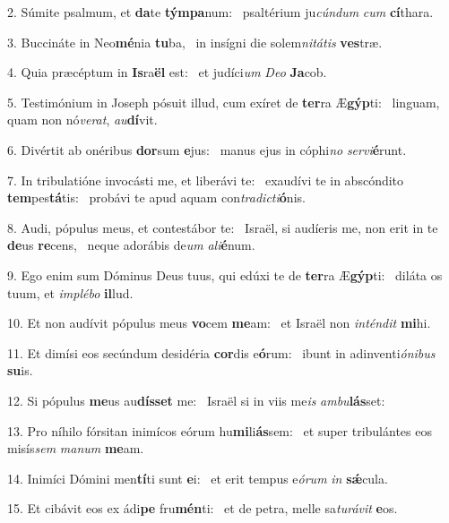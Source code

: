 2. Súmite psalmum, et \textbf{da}te \textbf{tým}\textbf{pa}num: \ast\  psaltérium ju\textit{cún}\textit{dum} \textit{cum} \textbf{cí}thara.\

3. Buccináte in Neo\textbf{mé}nia \textbf{tu}ba, \ast\  in insígni die solem\textit{ni}\textit{tá}\textit{tis} \textbf{ves}træ.\

4. Quia præcéptum in \textbf{Is}ra\textbf{ël} est: \ast\  et judíci\textit{um} \textit{De}\textit{o} \textbf{Ja}cob.\

5. Testimónium in Joseph pósuit illud, cum exíret de \textbf{ter}ra Æ\textbf{gýp}ti: \ast\  linguam, quam non nó\textit{ve}\textit{rat}, \textit{au}\textbf{dí}vit.\

6. Divértit ab onéribus \textbf{dor}sum \textbf{e}jus: \ast\  manus ejus in cóphi\textit{no} \textit{ser}\textit{vi}\textbf{é}runt.\

7. In tribulatióne invocásti me, et liberávi te: \dag\  exaudívi te in abscóndito \textbf{tem}pes\textbf{tá}tis: \ast\  probávi te apud aquam con\textit{tra}\textit{dic}\textit{ti}\textbf{ó}nis.\

8. Audi, pópulus meus, et contestábor te: \dag\  Israël, si audíeris me, non erit in te \textbf{de}us \textbf{re}cens, \ast\  neque adorábis de\textit{um} \textit{a}\textit{li}\textbf{é}num.\

9. Ego enim sum Dóminus Deus tuus, qui edúxi te de \textbf{ter}ra Æ\textbf{gýp}ti: \ast\  diláta os tuum, et \textit{im}\textit{plé}\textit{bo} \textbf{il}lud.\

10. Et non audívit pópulus meus \textbf{vo}cem \textbf{me}am: \ast\  et Israël non \textit{in}\textit{tén}\textit{dit} \textbf{mi}hi.\

11. Et dimísi eos secúndum desidéria \textbf{cor}dis e\textbf{ó}rum: \ast\  ibunt in adinventi\textit{ó}\textit{ni}\textit{bus} \textbf{su}is.\

12. Si pópulus \textbf{me}us au\textbf{dís}\textbf{set} me: \ast\  Israël si in viis me\textit{is} \textit{am}\textit{bu}\textbf{lás}set:\

13. Pro níhilo fórsitan inimícos eórum hu\textbf{mi}li\textbf{ás}sem: \ast\  et super tribulántes eos misís\textit{sem} \textit{ma}\textit{num} \textbf{me}am.\

14. Inimíci Dómini men\textbf{tí}ti sunt \textbf{e}i: \ast\  et erit tempus e\textit{ó}\textit{rum} \textit{in} \textbf{sǽ}cula.\

15. Et cibávit eos ex ádi\textbf{pe} fru\textbf{mén}ti: \ast\  et de petra, melle sa\textit{tu}\textit{rá}\textit{vit} \textbf{e}os.\

